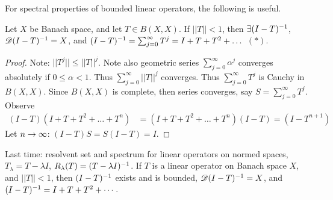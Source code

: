 \documentclass[]{article}
\begin{document}
For spectral properties of bounded linear operators, the following is useful.
\begin{theorem}
	Let $X$ be Banach space, and let $T\in B(X,X)$.
	If $||T||<1$, then $\exists(I-T)^{-1}$, $\mathscr{D}(I-T)^{-1}=X$, and $(I-T)^{-1} = \sum_{j=0}^\infty T^j = I+T+T^2+\dots$ $(*)$.
\end{theorem}
\begin{proof}
	Note: $||T^j|| \leq ||T||^j$.
	Note also geometric series $\sum_{j=0}^\infty \alpha^j$ converges absolutely if $0\leq\alpha<1$. Thus $\sum_{j=0}^\infty||T||^j$ converges.
	Thus $\sum_{j=0}^\infty T^j$ is Cauchy in $B(X,X)$.
	Since $B(X,X)$ is complete, then series converges, say $S=\sum_{j=0}^\infty T^j$.
	Observe
	\begin{align*}
		(I-T)(I+T+T^2+\dots+T^n)
		&= (I+T+T^2+\dots+T^n)(I-T)
		= (I-T^{n+1})
	\end{align*}
	Let $n\rightarrow\infty$:
	$ (I-T)S = S(I-T) = I$.
\end{proof}

Last time: resolvent set and spectrum for linear operators on normed spaces,
$T_\lambda = T-\lambda I$, $R_\lambda(T) = (T-\lambda I)^{-1}$.
If $T$ is a linear operator on Banach space $X$, and $||T||<1$, then $(I-T)^{-1}$ exists and is bounded, $\mathscr{D}(I-T)^{-1} = X$, and $(I-T)^{-1} = I+T+T^2+\cdots$.
\end{document}
